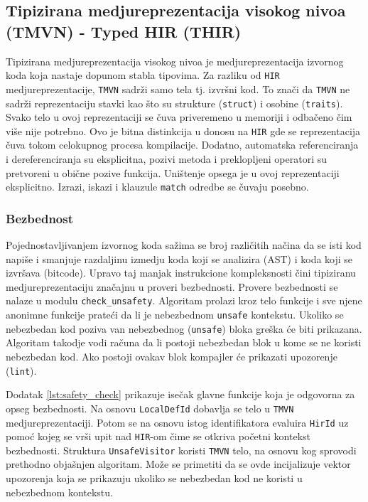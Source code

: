 \subsection{Tipizirana medjureprezentacija visokog nivoa (TMVN) - Typed HIR (THIR)}

Tipizirana medjureprezentacija visokog nivoa je medjureprezentacija izvornog koda koja nastaje dopunom stabla tipovima.
Za razliku od \verb|HIR| medjureprezentacije, \verb|TMVN| sadrži samo tela tj. izvršni kod. To znači da \verb|TMVN| 
ne sadrži reprezentaciju stavki kao što su strukture (\verb|struct|) i osobine (\verb|traits|). Svako telo u ovoj reprezentaciji
se čuva priveremeno u memoriji i odbačeno čim više nije potrebno. Ovo je bitna distinkcija u donosu na \verb|HIR| gde se reprezentacija 
čuva tokom celokupnog procesa kompilacije. Dodatno, automatska referenciranja i dereferenciranja su eksplicitna, pozivi metoda i 
preklopljeni operatori su pretvoreni u obične pozive funkcija. Uništenje opsega je u ovoj reprezentaciji eksplicitno.
Izrazi, iskazi i klauzule \verb|match| odredbe se čuvaju posebno.

\subsubsection{Bezbednost}

Pojednostavljivanjem izvornog koda sažima se broj različitih načina da se isti kod napiše i smanjuje razdaljinu izmedju 
koda koji se analizira (AST) i koda koji se izvršava (bitcode).
Upravo taj manjak instrukcione kompleksnosti čini tipiziranu medjureprezentaciju značajnu u proveri bezbednosti. 
Provere bezbednosti se nalaze u modulu \verb|check_unsafety|.
Algoritam prolazi kroz telo funkcije i sve njene anonimne funkcije prateći da li je nebezbednom \verb|unsafe| kontekstu.
Ukoliko se nebezbedan kod poziva van nebezbednog (\verb|unsafe|) bloka greška će biti prikazana. Algoritam takodje vodi računa da li 
postoji nebezbedan blok u kome se ne koristi nebezbedan kod. Ako postoji ovakav blok kompajler će prikazati upozorenje (\verb|lint|).

Dodatak \ref{lst:safety_check} prikazuje isečak glavne funkcije koja je odgovorna za opseg bezbednosti. 
Na osnovu \verb|LocalDefId| dobavlja se telo u \verb|TMVN| medjureprezentaciji. Potom se na osnovu istog 
identifikatora evaluira \verb|HirId| uz pomoć kojeg se vrši upit nad \verb|HIR|-om čime se otkriva početni kontekst bezbednosti.
Struktura \verb|UnsafeVisitor| koristi \verb|TMVN| telo, na osnovu kog sprovodi prethodno objašnjen algoritam. Može se primetiti 
da se ovde incijalizuje vektor upozorenja koja se prikazuju ukoliko se nebezbedan kod ne koristi u nebezbednom kontekstu.

